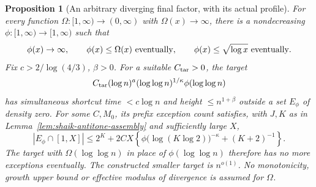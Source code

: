 \documentclass[11pt]{article}
\newtheorem{proposition}{Proposition}
\theoremstyle{remark}\newtheorem{remark}[proposition]{Remark}
\begin{document}
\begin{proposition}[An arbitrary diverging final factor, with its actual profile]
\label{prop:shaik-slow-factor}
For every function \(\Omega:[1,\infty)\to(0,\infty)\) with
\(\Omega(x)\to\infty\), there is a nondecreasing
\(\phi:[1,\infty)\to[1,\infty)\) such that
\[
 \phi(x)\to\infty,\qquad \phi(x)\le\Omega(x)\ \hbox{eventually},\qquad
 \phi(x)\le\sqrt{\log x}\ \hbox{eventually}.
\]
Fix \(c>2/\log(4/3)\), \(\beta>0\).
For a suitable \(C_{\rm tar}>0\), the target
\begin{equation}\label{eq:shaik-slow-target}
 C_{\rm tar}(\log n)^a(\log\log n)^{1/\kappa}\phi(\log\log n)
\end{equation}
has simultaneous shortcut time \(<c\log n\) and height
\(\le n^{1+\beta}\) outside a set \(E_\phi\) of density zero.
For some \(C,M_0\), its prefix exception count satisfies, with \(J,K\)
as in Lemma~\ref{lem:shaik-antitone-assembly} and sufficiently large \(X\),
\begin{equation}\label{eq:shaik-slow-prefix}
 |E_\phi\cap[1,X]|
 \le 2^K+2CX\left\{
       \phi\bigl(\log(K\log2)\bigr)^{-\kappa}+(K+2)^{-1}\right\}.
\end{equation}
The target with \(\Omega(\log\log n)\) in place of \(\phi(\log\log n)\)
therefore has no more exceptions eventually. The constructed smaller
target is \(n^{o(1)}\). No monotonicity, growth upper bound or effective
modulus of divergence is assumed for \(\Omega\).
\end{proposition}
\end{document}
